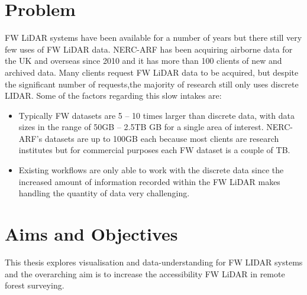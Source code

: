 \documentclass{subfiles}
\begin{document}
\section{Problem}\label{sec:Problem}
\par FW LiDAR systems have been available for a number of years but there still very few uses of FW LiDAR data. NERC-ARF has been acquiring airborne data for the UK and overseas since 2010 and it has more than 100 clients of new and archived data. Many clients request FW LiDAR data to be acquired, but despite the significant number of requests,the majority of research still only uses discrete LIDAR. Some of the factors regarding this slow intakes are:
\begin{itemize}
	\item Typically FW datasets are 5 – 10 times larger than discrete data, with data sizes in the range of 50GB – 2.5TB GB for a single area of interest. NERC-ARF's datasets are up to 100GB each because most clients are research institutes but for commercial purposes each FW dataset is a couple of TB.
	\item Existing workflows are only able to work with the discrete data since the increased amount of information recorded within the FW LiDAR makes handling the quantity of data very challenging.
\end{itemize}

\section {Aims and Objectives}

\par This thesis explores visualisation and data-understanding for FW LIDAR systems and the overarching aim is to increase the accessibility FW LiDAR in remote forest surveying.
\end{document}
